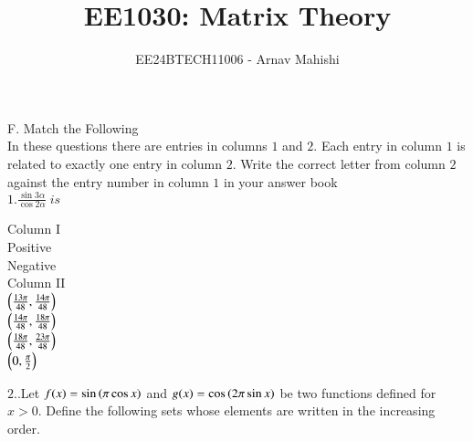 \documentclass[journal,12pt,twocolumn]{IEEEtran}
\theoremstyle{remark}
\begin{document}

\vspace{3cm}

\title{EE1030: Matrix Theory}
\author{EE24BTECH11006 - Arnav Mahishi}
\maketitle
\newpage
\bigskip

\renewcommand{\thefigure}{\theenumi}
\renewcommand{\thetable}{\theenumi}
F. Match the Following \\
In these questions there are entries in columns $1$ and $2$. Each entry in column $1$ is related to exactly one entry in column $2$. Write the correct letter from column $2$ against the entry number in column $1$ in your answer book
\\
$1. \frac{\sin3\alpha}{\cos2\alpha} \; is $\hfill{}
\\
\begin{multicols}{2}
Column I
\\
 Positive
\\
 Negative
\columnbreak
\\
Column II
\\
 $\left(\frac{13\pi}{48},\frac{14\pi}{48}\right)$
\\
 $\left(\frac{14\pi}{48},\frac{18\pi}{48}\right)$
\\
 $\left(\frac{18\pi}{48},\frac{23\pi}{48}\right)$
\\
 $\left(0,\frac{\pi}{2}\right)$


\end{multicols}


$2.$.Let $f(x) = \sin\left(\pi \cos x\right)$ and $g(x) = \cos\left(2\pi \sin x\right)$ be two functions defined for $x > 0$. Define the following sets whose elements are written in the increasing order. \hfill{}
 
\end{document}
